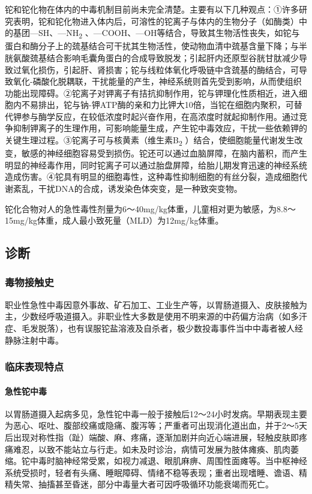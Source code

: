 铊和铊化物在体内的中毒机制目前尚未完全清楚。主要有以下几种观点：①许多研究表明，铊和铊化物进入体内后，可溶性的铊离子与体内的生物分子（如酶类）中的基团---SH、---NH\textsubscript{2}
、---COOH、---OH等结合，导致其生物活性丧失，如铊与蛋白和酶分子上的巯基结合可干扰其生物活性，使动物血清中巯基含量下降；与半胱氨酸巯基结合影响毛囊角蛋白的合成导致脱发；引起肝内还原型谷胱甘肽减少导致过氧化损伤，引起肝、肾损害；铊与线粒体氧化呼吸链中含巯基的酶结合，可导致氧化-磷酸化脱耦联，干扰能量的产生，神经系统则首先受到影响，从而使组织功能出现障碍。②铊离子对钾离子有拮抗抑制作用，铊与钾理化性质相近，进入细胞内不易排出，铊与钠-钾ATP酶的亲和力比钾大10倍，当铊在细胞内聚积，可替代钾参与酶学反应，在较低浓度时起兴奋作用，在高浓度时就起抑制作用。通过竞争抑制钾离子的生理作用，可影响能量生成，产生铊中毒效应，干扰一些依赖钾的关键生理过程。③铊离子可与核黄素（维生素B\textsubscript{2}
）结合，使细胞能量代谢发生改变，敏感的神经细胞容易受到损伤。铊还可以通过血脑屏障，在脑内蓄积，而产生明显的神经毒作用，同时铊离子可以通过胎盘屏障，给胎儿期发育迅速的神经系统造成伤害。④铊具有明显的细胞毒性，这种毒性抑制细胞的有丝分裂，造成细胞代谢紊乱，干扰DNA的合成，诱发染色体突变，是一种致突变物。

铊化合物对人的急性毒性剂量为6～40mg/kg体重，儿童相对更为敏感，为8.8～15mg/kg体重，成人最小致死量（MLD）为12mg/kg体重。

\subsection{诊断}

\subsubsection{毒物接触史}

职业性急性中毒因意外事故、矿石加工、工业生产等，以胃肠道摄入、皮肤接触为主，少数经呼吸道摄入。非职业性大多数是使用不明来源的中药偏方治病（如多汗症、毛发脱落），也有误服铊盐溶液及自杀者，极少数投毒事件当中中毒者被人经静脉注射中毒。

\subsubsection{临床表现特点}

\paragraph{急性铊中毒}

以胃肠道摄入起病多见，急性铊中毒一般于接触后12～24小时发病。早期表现主要为恶心、呕吐、腹部绞痛或隐痛、腹泻等；严重者可出现消化道出血，并于2～5天后出现对称性指（趾）端酸、麻、疼痛，逐渐加剧并向近心端进展，轻触皮肤即疼痛难忍，以致不能站立与行走。如未及时诊治，病情可发展为肢体瘫痪、肌肉萎缩。铊中毒时脑神经常受累，如视力减退、眼肌麻痹、周围性面瘫等。当中枢神经系统受损时，轻者有头痛、睡眠障碍、情绪不稳等表现；重者出现嗜睡、谵语、精精失常、抽搐甚至昏迷，部分中毒量大者可因呼吸循环功能衰竭而死亡。

